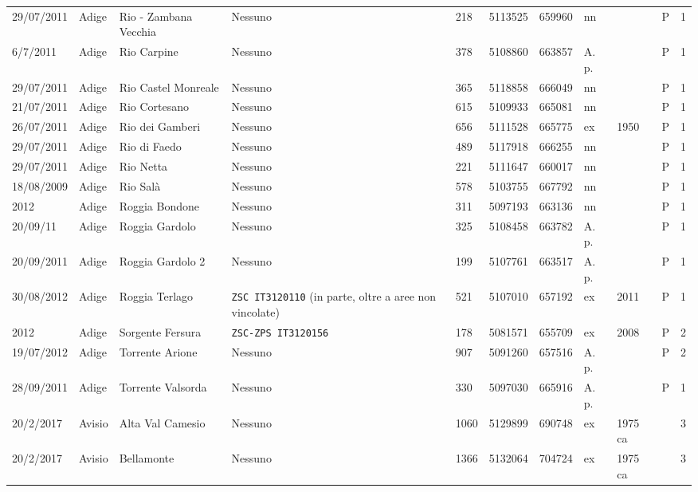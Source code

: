 \documentclass[11pt,a4paper,italian,twoside,openany]{memoir}
\begin{document}
\begin{longtable}[c]{p{}p{}p{}p{}p{}p{}p{}p{}p{}p{}l}
\rowcolor[HTML]{EFEFEF} 29/07/2011 & Adige  & Rio - Zambana Vecchia & Nessuno & 218 & 5113525  & 659960 & nn   &   & P & 1   \\
6/7/2011  & Adige  & Rio Carpine & Nessuno & 378 & 5108860  & 663857 & A. p.  &   & P & 1   \\
\rowcolor[HTML]{EFEFEF} 29/07/2011 & Adige  & Rio Castel Monreale   & Nessuno & 365 & 5118858  & 666049 & nn   &   & P & 1   \\
21/07/2011 & Adige  & Rio Cortesano  & Nessuno & 615 & 5109933  & 665081 & nn   &   & P & 1   \\
\rowcolor[HTML]{EFEFEF} 26/07/2011 & Adige  & Rio dei Gamberi & Nessuno & 656 & 5111528  & 665775 & ex   & 1950  & P & 1   \\
29/07/2011 & Adige  & Rio di Faedo   & Nessuno & 489 & 5117918  & 666255 & nn   &   & P & 1   \\
\rowcolor[HTML]{EFEFEF} 29/07/2011 & Adige  & Rio Netta  & Nessuno & 221 & 5111647  & 660017 & nn   &   & P & 1   \\
18/08/2009 & Adige  & Rio Salà   & Nessuno & 578 & 5103755  & 667792 & nn   &   & P & 1   \\
\rowcolor[HTML]{EFEFEF} 2012  & Adige  & Roggia Bondone & Nessuno & 311 & 5097193  & 663136 & nn   &   & P & 1   \\
20/09/11  & Adige  & Roggia Gardolo & Nessuno & 325 & 5108458  & 663782 & A. p.  &   & P & 1   \\
\rowcolor[HTML]{EFEFEF} 20/09/2011 & Adige  & Roggia Gardolo 2 & Nessuno & 199 & 5107761  & 663517 & A. p.  &   & P & 1   \\
30/08/2012 & Adige  & Roggia Terlago & \texttt{ZSC IT3120110} (in parte, oltre a aree non vincolate) & 521 & 5107010  & 657192 & ex   & 2011  & P & 1   \\
\rowcolor[HTML]{EFEFEF} 2012  & Adige  & Sorgente Fersura & \texttt{ZSC-ZPS IT3120156}   & 178 & 5081571  & 655709 & ex   & 2008  & P & 2   \\
19/07/2012 & Adige  & Torrente Arione & Nessuno & 907 & 5091260  & 657516 & A. p.  &   & P & 2   \\
\rowcolor[HTML]{EFEFEF} 28/09/2011 & Adige  & Torrente Valsorda   & Nessuno & 330 & 5097030  & 665916 & A. p.  &   & P  & 1   \\
20/2/2017 & Avisio & Alta Val Camesio & Nessuno & 1060  & 5129899  & 690748 & ex   & 1975 ca &  & 3   \\
\rowcolor[HTML]{EFEFEF} 20/2/2017 & Avisio & Bellamonte & Nessuno & 1366  & 5132064  & 704724 & ex   & 1975 ca &  & 3   \\

\end{longtable}
\end{document}
